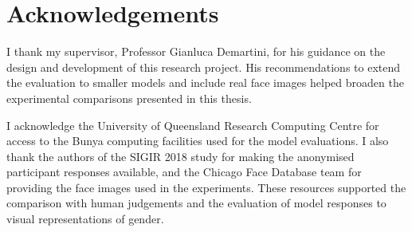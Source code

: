 \chapter*{Acknowledgements}


I thank my supervisor, Professor Gianluca Demartini, for his guidance on the
design and development of this research project. His recommendations to
extend the evaluation to smaller models and include real face images helped
broaden the experimental comparisons presented in this thesis.

I acknowledge the University of Queensland Research Computing Centre for
access to the Bunya computing facilities used for the model evaluations.
I also thank the authors of the SIGIR 2018 study for making the anonymised
participant responses available, and the Chicago Face Database team for
providing the face images used in the experiments. These resources supported
the comparison with human judgements and the evaluation of model responses
to visual representations of gender.
\clearpage
